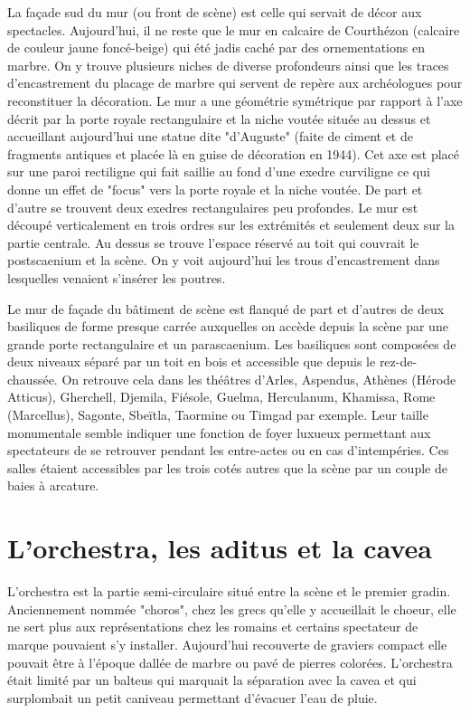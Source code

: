 		La façade sud du mur (ou front de scène) est celle qui servait de décor aux spectacles. Aujourd'hui, il ne reste que le mur en calcaire de Courthézon (calcaire de couleur jaune foncé-beige) qui été jadis caché par des ornementations en marbre. On y trouve plusieurs niches de diverse profondeurs ainsi que les traces d'encastrement du placage de marbre qui servent de repère aux archéologues pour reconstituer la décoration. Le mur a une géométrie symétrique par rapport à l'axe décrit par la porte royale rectangulaire et la niche voutée située au dessus et accueillant aujourd'hui une statue dite "d'Auguste" (faite de ciment et de fragments antiques et placée là en guise de décoration en 1944). Cet axe est placé sur une paroi rectiligne qui fait saillie au fond d'une \gls{exedre} curviligne ce qui donne un effet de "focus" vers la porte royale et la niche voutée. De part et d'autre se trouvent deux  \glspl{exedre} rectangulaires peu profondes. Le mur est découpé verticalement en trois ordres sur les extrémités et seulement deux sur la partie centrale. Au dessus se trouve l'espace réservé au toit qui couvrait le \gls{postscaenium} et la scène. On y voit aujourd'hui les trous d'encastrement dans lesquelles venaient s'insérer les poutres.
		
		Le mur de façade du bâtiment de scène est flanqué de part et d'autres de deux \glspl{basilique} de forme presque carrée auxquelles on accède depuis la scène par une grande porte rectangulaire et un \gls{parascaenium}. Les \glspl{basilique} sont composées de deux niveaux séparé par un toit en bois et accessible que depuis le rez-de-chaussée. On retrouve cela dans les théâtres d'Arles, Aspendus, Athènes (Hérode Atticus), Gherchell, Djemila, Fiésole, Guelma, Herculanum, Khamissa, Rome (Marcellus), Sagonte, Sbeïtla, Taormine ou Timgad par exemple. Leur taille monumentale semble indiquer une fonction de foyer luxueux permettant aux spectateurs de se retrouver pendant les entre-actes ou en cas d'intempéries. Ces salles étaient accessibles par les trois cotés autres que la scène par un couple de baies à arcature.
		
				
		\section{L'\gls{orchestra}, les \gls{aditus} et la \gls{cavea}}
		
	
	L'\gls{orchestra} est la partie semi-circulaire situé entre la scène et le premier gradin. Anciennement nommée "choros", chez les grecs qu'elle y accueillait le choeur, elle ne sert plus aux représentations chez les romains et certains spectateur de marque pouvaient s'y installer. Aujourd'hui recouverte de graviers compact elle pouvait être à l'époque dallée de marbre ou pavé de pierres colorées. L'\gls{orchestra} était limité par un \gls{balteus} qui marquait la séparation avec la \gls{cavea} et qui surplombait un petit caniveau permettant d'évacuer l'eau de pluie.
	
